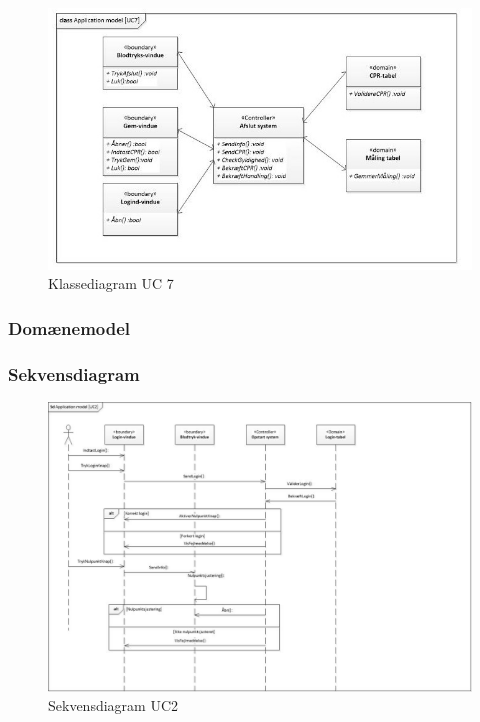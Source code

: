 \begin{figure}[H]
	\includegraphics[width=1\textwidth]{Figurer/classAppModelUC7}
	\caption{Klassediagram UC 7}
	\label{classApp UC7}
\end{figure}



\subsubsection{Domænemodel}

\subsubsection{Sekvensdiagram}
\begin{figure}[H]
	\includegraphics[width=1\textwidth]{Figurer/sdAppModelUC2}
	\caption{Sekvensdiagram UC2}
	\label{sd UC2}
\end{figure}

